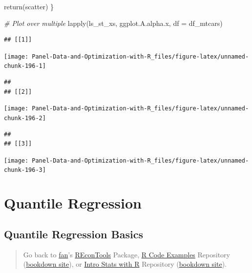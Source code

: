 \documentclass[
]{book}
\newenvironment{Shaded}{\begin{snugshade}}{\end{snugshade}}
\newcommand{\AttributeTok}[1]{\textcolor[rgb]{0.77,0.63,0.00}{#1}}
\newcommand{\CommentTok}[1]{\textcolor[rgb]{0.56,0.35,0.01}{\textit{#1}}}
\newcommand{\FunctionTok}[1]{\textcolor[rgb]{0.00,0.00,0.00}{#1}}
\newcommand{\NormalTok}[1]{#1}
\begin{document}
\begin{Shaded}
\begin{Highlighting}[]
\FunctionTok{return}\NormalTok{(scatter)}
\NormalTok{\}}

\CommentTok{\# Plot over multiple}
\FunctionTok{lapply}\NormalTok{(ls\_st\_xs,}
\NormalTok{       ggplot.A.alpha.x,}
       \AttributeTok{df =}\NormalTok{ df\_mtcars)}
\end{Highlighting}
\end{Shaded}

\begin{verbatim}
## [[1]]
\end{verbatim}

\begin{center}\texttt{[image: Panel-Data-and-Optimization-with-R\_files/figure-latex/unnamed-chunk-196-1]} \end{center}

\begin{verbatim}
## 
## [[2]]
\end{verbatim}

\begin{center}\texttt{[image: Panel-Data-and-Optimization-with-R\_files/figure-latex/unnamed-chunk-196-2]} \end{center}

\begin{verbatim}
## 
## [[3]]
\end{verbatim}

\begin{center}\texttt{[image: Panel-Data-and-Optimization-with-R\_files/figure-latex/unnamed-chunk-196-3]} \end{center}

\hypertarget{quantile-regression}{%
\section{Quantile Regression}\label{quantile-regression}}

\hypertarget{quantile-regression-basics}{%
\subsection{Quantile Regression Basics}\label{quantile-regression-basics}}

\begin{quote}
Go back to \href{http://fanwangecon.github.io/}{fan}'s \href{https://fanwangecon.github.io/REconTools/}{REconTools} Package, \href{https://fanwangecon.github.io/R4Econ/}{R Code Examples} Repository (\href{https://fanwangecon.github.io/R4Econ/bookdown}{bookdown site}), or \href{https://fanwangecon.github.io/Stat4Econ/}{Intro Stats with R} Repository (\href{https://fanwangecon.github.io/Stat4Econ/bookdown}{bookdown site}).
\end{quote}
\end{document}
